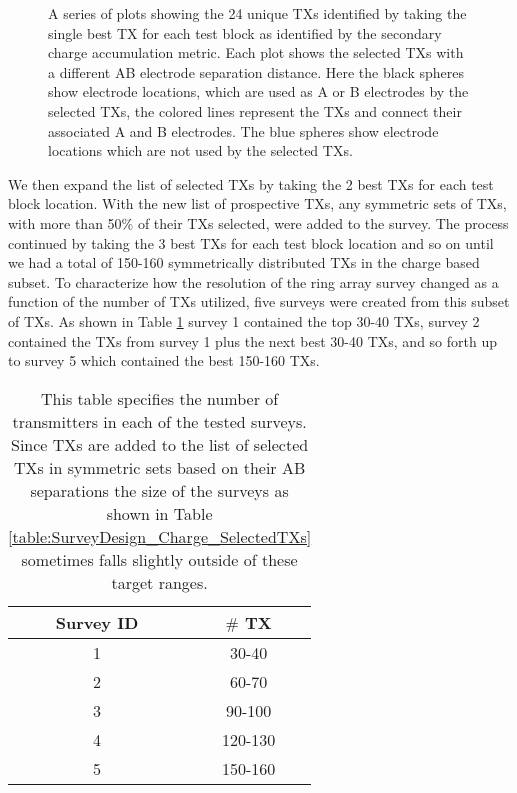 \documentclass[preprint,authoryear,12pt]{elsarticle}
\begin{document}
\begin{figure} [htp]
\begin{center}
    \end{center}
    \vspace{-0.5cm}
\caption{A series of plots showing the 24 unique TXs identified by taking the single best TX for each test block as identified by the secondary charge accumulation metric. Each plot shows the selected TXs with a different AB electrode separation distance. Here the black spheres show electrode locations, which are used as A or B electrodes by the selected TXs, the colored lines represent the TXs and connect their associated A and B electrodes. The blue spheres show electrode locations which are not used by the selected TXs.}
\label{fig:SurveyDesign_Charge_1TXPerBlk}
\end{figure}


We then expand the list of selected TXs by taking the 2 best TXs for each test block location. With the new list of prospective TXs, any symmetric sets of TXs, with more than 50\% of their TXs selected, were added to the survey. The process continued by taking the 3 best TXs for each test block location and so on until we had a total of 150-160 symmetrically distributed TXs in the charge based subset. To characterize how the resolution of the ring array survey changed as a function of the number of TXs utilized, five surveys were created from this subset of TXs. As shown in Table \ref{table:SurveyDesign_SurveyID_vs_NumTX} survey 1 contained the top 30-40 TXs, survey 2 contained the TXs from survey 1 plus the next best 30-40 TXs, and so forth up to survey 5 which contained the best 150-160 TXs.


\begin{table} [htp]
   \footnotesize
   \begin{center}
      \begin{tabular}{| c | c |}
         \hline
         \textbf{Survey ID} & \textbf{\mbox{\boldmath$\#$} TX} \\
         \hline
         1 & 30-40 \\
         \hline
         2 & 60-70 \\
         \hline
         3 & 90-100 \\
         \hline
         4 & 120-130 \\
         \hline
         5 & 150-160 \\
         \hline
      \end{tabular}
   \end{center}
\caption{This table specifies the number of transmitters in each of the tested surveys. Since TXs are added to the list of selected TXs in symmetric sets based on their AB separations the size of the surveys as shown in Table \ref{table:SurveyDesign_Charge_SelectedTXs} sometimes falls slightly outside of these target ranges.}
\label{table:SurveyDesign_SurveyID_vs_NumTX}
\end{table}
\end{document}
